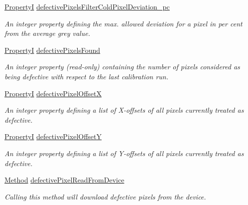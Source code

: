 \begin{DoxyCompactItemize}
\hyperlink{group___common_interface_ga12d5e434238ca242a1ba4c6c3ea45780}{Property\+I} \hyperlink{classmv_i_m_p_a_c_t_1_1acquire_1_1_image_processing_ae49f3046e9f407c2e3ef7c7e85d204cb}{defective\+Pixels\+Filter\+Cold\+Pixel\+Deviation\+\_\+pc}
\begin{DoxyCompactList}\small\item\em An integer property defining the max. allowed deviation for a pixel in per cent from the average grey value. \end{DoxyCompactList}\item 
\hyperlink{group___common_interface_ga12d5e434238ca242a1ba4c6c3ea45780}{Property\+I} \hyperlink{classmv_i_m_p_a_c_t_1_1acquire_1_1_image_processing_adcd6475ebbec9d0d3f0968a0e383449d}{defective\+Pixels\+Found}
\begin{DoxyCompactList}\small\item\em An integer property {\bfseries }(read-\/only) containing the number of pixels considered as being defective with respect to the last calibration run. \end{DoxyCompactList}\item 
\hyperlink{group___common_interface_ga12d5e434238ca242a1ba4c6c3ea45780}{Property\+I} \hyperlink{classmv_i_m_p_a_c_t_1_1acquire_1_1_image_processing_a0a5a32575a86e5f69eea1b5a0e1bb728}{defective\+Pixel\+Offset\+X}
\begin{DoxyCompactList}\small\item\em An integer property defining a list of X-\/offsets of all pixels currently treated as defective. \end{DoxyCompactList}\item 
\hyperlink{group___common_interface_ga12d5e434238ca242a1ba4c6c3ea45780}{Property\+I} \hyperlink{classmv_i_m_p_a_c_t_1_1acquire_1_1_image_processing_a6339b18435a6c6e16b3e2a8faba9f7f1}{defective\+Pixel\+Offset\+Y}
\begin{DoxyCompactList}\small\item\em An integer property defining a list of Y-\/offsets of all pixels currently treated as defective. \end{DoxyCompactList}\item 
\hyperlink{classmv_i_m_p_a_c_t_1_1acquire_1_1_method}{Method} \hyperlink{classmv_i_m_p_a_c_t_1_1acquire_1_1_image_processing_aebd10f27aaab9228b4d3d207a6b27aca}{defective\+Pixel\+Read\+From\+Device}
\begin{DoxyCompactList}\small\item\em Calling this method will download defective pixels from the device. \end{DoxyCompactList}\item 

\end{DoxyCompactItemize}
